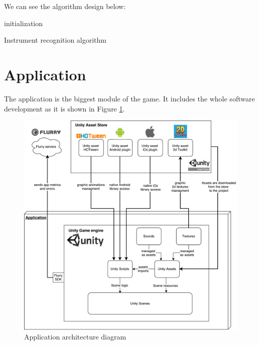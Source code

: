 We can see the algorithm design below:

\begin{algorithm}[ht!]

 \BlankLine
 initialization\;
 \caption{Instrument recognition algorithm}
\end{algorithm}

\newpage
\section{Application}
\label{sec:application}
The application is the biggest module of the game. It includes the whole software development as it is shown in Figure \ref{fig:applicationarchitecture}.

\begin{figure}[ht!]
	\centering
	\includegraphics[width=400pt]{graphics/architecture/Application_architecture.pdf}
	\caption{Application architecture diagram}
	\label{fig:applicationarchitecture}
\end{figure}

